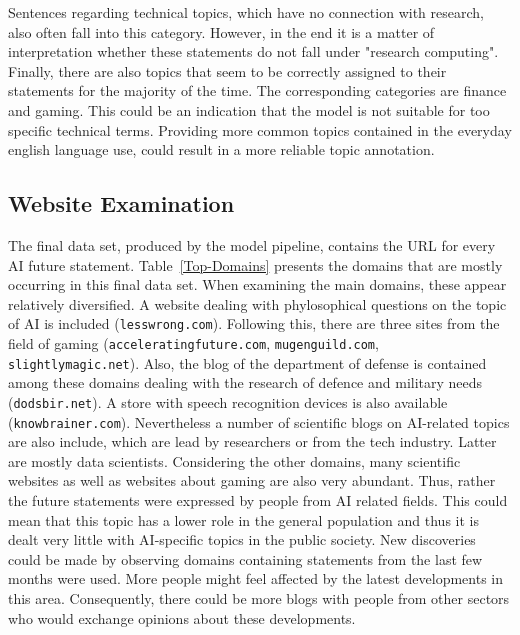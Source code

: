 Sentences regarding technical topics, which have no connection with research, also often fall into this category.
However, in the end it is a matter of interpretation whether these statements do not fall under "research computing".
\\
Finally, there are also topics that seem to be correctly assigned to their statements for the majority of the time.
The corresponding categories are finance and gaming.
This could be an indication that the model is not suitable for too specific technical terms.
Providing more common topics contained in the everyday english language use, could result in a more reliable topic annotation.

\subsection{Website Examination}
The final data set, produced by the model pipeline, contains the URL for every AI future statement.
Table~\ref{Top-Domains} presents the domains that are mostly occurring in this final data set.
When examining the main domains, these appear relatively  diversified.
A website dealing with phylosophical questions on the topic of AI is included (\texttt{lesswrong.com}).
Following this, there are three sites from the field of gaming (\texttt{acceleratingfuture.com}, \texttt{mugenguild.com}, \texttt{slightlymagic.net}).
Also, the blog of the department of defense is contained among these domains dealing with the research of defence and military needs (\texttt{dodsbir.net}).
A store with speech recognition devices is also available (\texttt{knowbrainer.com}).
Nevertheless a number of scientific blogs on AI-related topics are also include, which are lead by researchers or from the tech industry.
Latter are mostly data scientists.
Considering the other domains, many scientific websites as well as websites about gaming are also very abundant.
Thus, rather the future statements were expressed by people from AI related fields.
This could mean that this topic has a lower role in the general population and thus it is dealt very little with AI-specific topics in the public society.
New discoveries could be made by observing domains containing statements from the last few months were used.
More people might feel affected by the latest developments in this area.
Consequently, there could be more blogs with people from other sectors who would exchange opinions about these developments.

